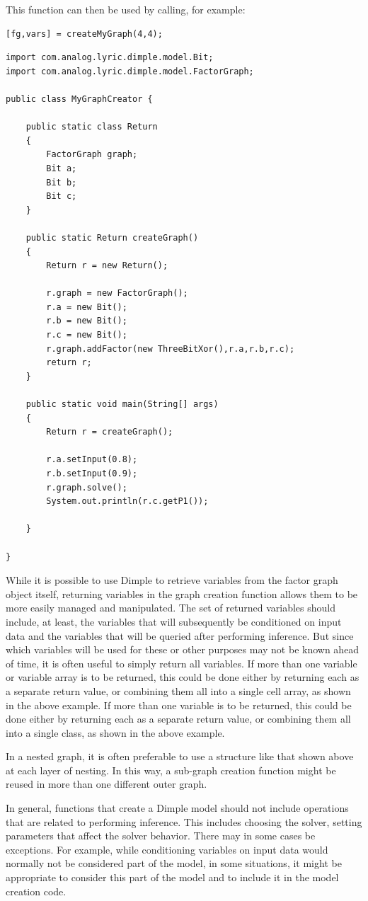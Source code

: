 This function can then be used by calling, for example:

\begin{lstlisting}
[fg,vars] = createMyGraph(4,4);
\end{lstlisting}

\fi

\ifjava
\begin{lstlisting}
import com.analog.lyric.dimple.model.Bit;
import com.analog.lyric.dimple.model.FactorGraph;

public class MyGraphCreator {

	public static class Return
	{
		FactorGraph graph;
		Bit a;
		Bit b;
		Bit c;
	}
	
	public static Return createGraph()
	{
		Return r = new Return();
		
		r.graph = new FactorGraph();
		r.a = new Bit();
		r.b = new Bit();
		r.c = new Bit();
		r.graph.addFactor(new ThreeBitXor(),r.a,r.b,r.c);
		return r;
	}
	
	public static void main(String[] args) 
	{
		Return r = createGraph();
		
		r.a.setInput(0.8);
		r.b.setInput(0.9);
		r.graph.solve();
		System.out.println(r.c.getP1());

	}

}
\end{lstlisting}
\fi

While it is possible to use Dimple to retrieve variables from the factor graph object itself, returning variables in the graph creation function allows them to be more easily managed and manipulated.  The set of returned variables should include, at least, the variables that will subsequently be conditioned on input data and the variables that will be queried after performing inference.  But since which variables will be used for these or other purposes may not be known ahead of time, it is often useful to simply return all variables.  \ifmatlab If more than one variable or variable array is to be returned, this could be done either by returning each as a separate return value, or combining them all into a single cell array, as shown in the above example.  \fi   \ifjava If more than one variable is to be returned, this could be done either by returning each as a separate return value, or combining them all into a single class, as shown in the above example.  \fi

In a nested graph, it is often preferable to use a structure like that shown above at each layer of nesting.  In this way, a sub-graph creation function might be reused in more than one different outer graph.

In general, functions that create a Dimple model should not include operations that are related to performing inference.  This includes choosing the solver, setting parameters that affect the solver behavior.  There may in some cases be exceptions.  For example, while conditioning variables on input data would normally not be considered part of the model, in some situations, it might be appropriate to consider this part of the model and to include it in the model creation code.



